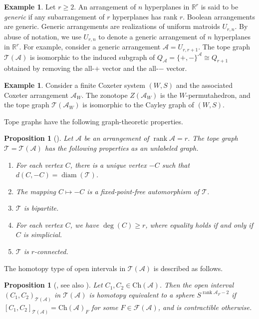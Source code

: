 \documentclass{amsart}
\numberwithin{equation}{section}
\newtheorem{prop}[thm]{Proposition}
\theoremstyle{plain}
\theoremstyle{remark}
\theoremstyle{definition}
\newtheorem{ex}[thm]{Example}
\numberwithin{equation}{section}
\newcommand{\A}{\mathcal{A}}
\newcommand{\T}{\mathcal{T}}
\newcommand{\FF}{\mathcal{F}}
\newcommand{\R}{\mathbb{R}}
\newcommand{\Ch}{\mathrm{Ch}}
\DeclareMathOperator{\rank}{rank}
\DeclareMathOperator{\diam}{diam}
\begin{document}
\begin{ex}\label{topegeneric}
    Let $r\geq 2$. An arrangement of $n$ hyperplanes in $\R^r$ is said to be \emph{generic} if any subarrangement of $r$ hyperplanes has rank $r$. Boolean arrangements are generic. Generic arrangements are realizations of uniform matroids $U_{r,n}$. By abuse of notation, we use $U_{r,n}$ to denote a generic arrangement of $n$ hyperplanes in $\R^r$. For example, consider a generic arrangement $\A=U_{r,r+1}$. The tope graph $\T(\A)$ is isomorphic to the induced subgraph of $Q_{\A}=\{+,-\}^{\A}\cong Q_{r+1}$ obtained by removing the all-$+$ vector and the all-$-$ vector. 
\end{ex}

\begin{ex}\label{topecoxeter}
    Consider a finite Coxeter system $(W,S)$ and the associated Coxeter arrangement $\A_W$. The zonotope $Z(\A_W)$ is the $W$-permutahedron, and the tope graph $\T(\A_W)$ is isomorphic to the Cayley graph of $(W,S)$.
\end{ex}


Tope graphs have the following graph-theoretic properties. 
\begin{prop}[{\cite[Propositions 4.2.15 and 4.4.8]{Bjorner1999}}]\label{basic}
    Let $\A$ be an arrangement of $\rank \A=r$. The tope graph $\T=\T(\A)$ has the following properties as an unlabeled graph.
    \begin{enumerate}
        \item For each vertex $C$, there is a unique vertex $-C$ such that $d(C,-C)=\diam(\T)$.
        \item The mapping $C\mapsto -C$ is a fixed-point-free automorphism of $\T$.
        \item $\T$ is bipartite.
        \item For each vertex $C$, we have $\deg(C)\geq r$, where equality holds if and only if $C$ is simplicial.
        \item $\T$ is $r$-connected.
    \end{enumerate}
\end{prop}

The homotopy type of open intervals in $\T(\A)$ is described as follows.

\begin{prop}[{\cite[Theorem 2.2]{Edelman1985}}, see also {\cite[Theorem 4.4.2]{Bjorner1999}}]\label{intervelhomotopy}
    Let $C_1,C_2\in \Ch(\A)$.
    Then the open interval $(C_1,C_2)_{\T(\A)}$ in $\T(\A)$ is homotopy equivalent to a sphere $S^{\rank \A_F-2}$ if $[C_1,C_2]_{\T(\A)}=\Ch(\A)_F$ for some $F\in\FF(\A)$, and is contractible otherwise.
\end{prop}
\end{document}
